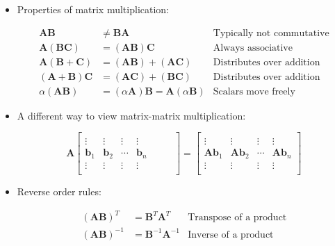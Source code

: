 \documentclass[main.tex]{subfiles}
\begin{document}
    \begin{itemize}
        \item Properties of matrix multiplication:

        $$
        \begin{aligned}
        \mathbf{A B} & \neq \mathbf{B A} & \text{Typically not commutative}\\
        \mathbf{A}(\mathbf{B C}) &=(\mathbf{A B}) \mathbf{C} & \text{Always associative}\\
        \mathbf{A}(\mathbf{B}+\mathbf{C}) &=(\mathbf{A B})+(\mathbf{A C}) & \text{Distributes over addition}\\
        (\mathbf{A}+\mathbf{B}) \mathbf{C} &=(\mathbf{A} \mathbf{C})+(\mathbf{B C}) & \text{Distributes over addition}\\
        \alpha(\mathbf{A B}) &=(\alpha \mathbf{A}) \mathbf{B}=\mathbf{A}(\alpha \mathbf{B}) & \text{Scalars move freely} 
        \end{aligned}
        $$

        \item A different way to view matrix-matrix multiplication:
        
        $$
        \mathbf{A}\left[\begin{array}{cccc} 
        & & & \\
        \vdots & \vdots & \vdots & \vdots \\
        \mathbf{b}_{1} & \mathbf{b}_{2} & \cdots & \mathbf{b}_{n} \\
        \vdots & \vdots & \vdots & \vdots
        & & & \\
        \end{array}\right]=\left[\begin{array}{cccc}
        & & & \\
        \vdots & \vdots & \vdots & \vdots \\
        \mathbf{A b}_{1} & \mathbf{A b}_{2} & \cdots & \mathbf{A} \mathbf{b}_{n} \\
        \vdots & \vdots & \vdots & \vdots \\
        & & &
        \end{array}\right]
        $$
        
        \item Reverse order rules: 
        
        $$
        \begin{aligned}
        (\mathbf{A B})^{T} & =\mathbf{B}^{T} \mathbf{A}^{T} & \text{Transpose of a product} \\
        (\mathbf{A B})^{-1} & =\mathbf{B}^{-1} \mathbf{A}^{-1} & \text{Inverse of a product}
        \end{aligned}
        $$
        

\end{itemize}
\end{document}
